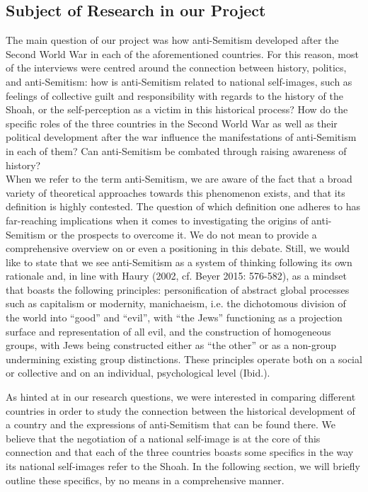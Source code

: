 \subsection*{Subject of Research in our Project}
The main question of our project was how anti-Semitism developed after the Second World War in each of the aforementioned countries. For this reason, most of the interviews were centred around the connection between history, politics, and anti-Semitism: how is anti-Semitism related to national self-images, such as feelings of collective guilt and responsibility with regards to the history of the Shoah, or the self-perception as a victim in this historical process? How do the specific roles of the three countries in the Second World War as well as their political development after the war influence the manifestations of anti-Semitism in each of them? Can anti-Semitism be combated through raising awareness of history? \\
When we refer to the term anti-Semitism, we are aware of the fact that a broad variety of theoretical approaches towards this phenomenon exists, and that its definition is highly contested. The question of which definition one adheres to has far-reaching implications when it comes to investigating the origins of anti-Semitism or the prospects to overcome it. We do not mean to provide a comprehensive overview on or even a positioning in this debate. Still, we would like to state that we see anti-Semitism as a system of thinking following its own rationale and, in line with Haury (2002, cf. Beyer 2015: 576-582), as a mindset that boasts the following principles: personification of abstract global processes such as capitalism or modernity, manichaeism, i.e. the dichotomous division of the world into ``good'' and ``evil'', with ``the Jews'' functioning as a projection surface and representation of all evil, and the construction of homogeneous groups, with Jews being constructed either as ``the other'' or as a non-group undermining existing group distinctions. These principles operate both on a social or collective and on an individual, psychological level (Ibid.).\par
As hinted at in our research questions, we were interested in comparing different countries in order to study the connection between the historical development of a country and the expressions of anti-Semitism that can be found there. We believe that the negotiation of a national self-image is at the core of this connection and that each of the three countries boasts some specifics in the way its national self-images refer to the Shoah. In the following section, we will briefly outline these specifics, by no means in a comprehensive manner. \par
